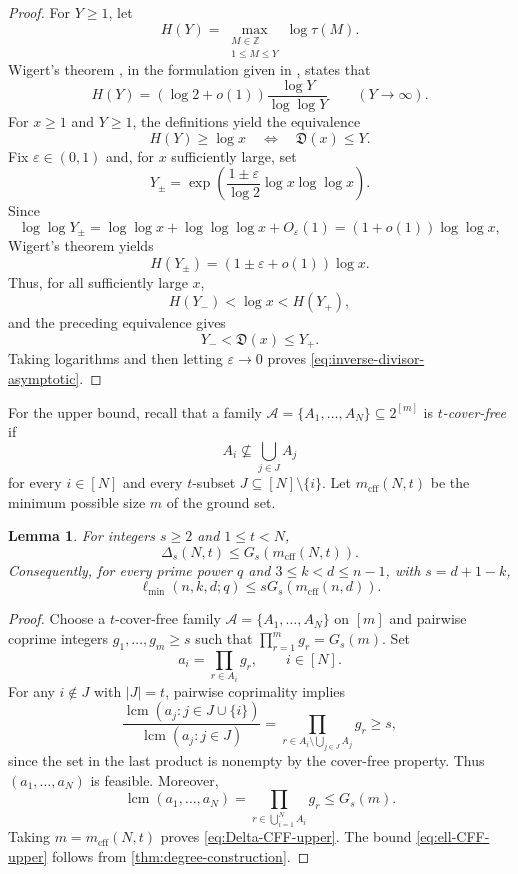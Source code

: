 \documentclass[11pt,onecolumn]{IEEEtran}
\newtheorem{lemma}{Lemma}
\newcommand{\lcmop}{\operatorname{lcm}}
\newcommand{\mcff}{m_{\mathrm{cff}}}
\newcommand{\ellmin}{\ell_{\min}}
\begin{document}
\begin{proof}
For $Y\ge1$, let
\[
H(Y)=\max_{\substack{M\in\mathbb Z\\1\le M\le Y}}\log\tau(M).
\]
Wigert's theorem \cite{Wigert1907}, in the formulation given in
\cite{Elsholtz2019}, states that
\[
H(Y)=(\log2+o(1))\frac{\log Y}{\log\log Y}
\qquad(Y\to\infty).
\]
For $x\ge1$ and $Y\ge1$, the definitions yield the equivalence
\[
H(Y)\ge\log x
\quad\Longleftrightarrow\quad
\mathfrak D(x)\le Y.
\]
Fix $\varepsilon\in(0,1)$ and, for $x$ sufficiently large, set
\[
Y_\pm=
\exp\!\left(\frac{1\pm\varepsilon}{\log2}
\log x\log\log x\right).
\]
Since
\[
\log\log Y_\pm
=\log\log x+\log\log\log x+O_\varepsilon(1)
=(1+o(1))\log\log x,
\]
Wigert's theorem yields
\[
H(Y_\pm)=(1\pm\varepsilon+o(1))\log x.
\]
Thus, for all sufficiently large $x$,
\[
H(Y_-)<\log x<H(Y_+),
\]
and the preceding equivalence gives
\[
Y_-<\mathfrak D(x)\le Y_+.
\]
Taking logarithms and then letting $\varepsilon\to0$
proves \eqref{eq:inverse-divisor-asymptotic}.
\end{proof}

For the upper bound, recall that a family
$\mathcal A=\{A_1,\ldots,A_N\}\subseteq2^{[m]}$ is
\emph{$t$-cover-free} if
\[
A_i\not\subseteq\bigcup_{j\in J}A_j
\]
for every $i\in[N]$ and every $t$-subset
$J\subseteq[N]\setminus\{i\}$.
Let $\mcff(N,t)$ be the minimum possible size $m$ of the
ground set.

\begin{lemma}
\label{lem:CFF-upper}
For integers $s\ge2$ and $1\le t<N$,
\begin{equation}
\Delta_s(N,t)\le G_s(\mcff(N,t)).
\label{eq:Delta-CFF-upper}
\end{equation}
Consequently, for every prime power $q$ and
$3\le k<d\le n-1$, with $s=d+1-k$,
\begin{equation}
\ellmin(n,k,d;q)\le sG_s(\mcff(n,d)).
\label{eq:ell-CFF-upper}
\end{equation}
\end{lemma}

\begin{proof}
Choose a $t$-cover-free family
$\mathcal A=\{A_1,\ldots,A_N\}$ on $[m]$ and pairwise
coprime integers $g_1,\ldots,g_m\ge s$ such that
$\prod_{r=1}^{m}g_r=G_s(m)$.  Set
\[
a_i=\prod_{r\in A_i}g_r,
\qquad i\in[N].
\]
For any $i\notin J$ with $|J|=t$, pairwise coprimality implies
\[
\frac{\lcmop(a_j:j\in J\cup\{i\})}
     {\lcmop(a_j:j\in J)}
=
\prod_{r\in A_i\setminus\bigcup_{j\in J}A_j}g_r\ge s,
\]
since the set in the last product is nonempty by the
cover-free property.  Thus $(a_1,\ldots,a_N)$ is feasible.
Moreover,
\[
\lcmop(a_1,\ldots,a_N)
=\prod_{r\in\bigcup_{i=1}^{N}A_i}g_r
\le G_s(m).
\]
Taking $m=\mcff(N,t)$ proves \eqref{eq:Delta-CFF-upper}.
The bound \eqref{eq:ell-CFF-upper} follows from
\cref{thm:degree-construction}.
\end{proof}
\end{document}

